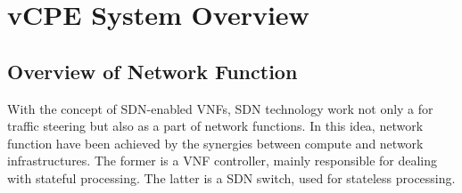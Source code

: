 \documentclass[journal]{IEEEtran}
\begin{document}
%





\section{vCPE System Overview}
\subsection{Overview of Network Function}\label{ssec:nfv_overview}
With the concept of SDN-enabled\cite{sdn-enabled} VNFs, SDN technology work not only a for traffic steering but also as a part of network functions. In this idea, network function have been achieved by the synergies between compute and network infrastructures. The former is a VNF controller, mainly responsible for dealing with stateful processing. The latter is a SDN switch, used for stateless processing.
\end{document}
